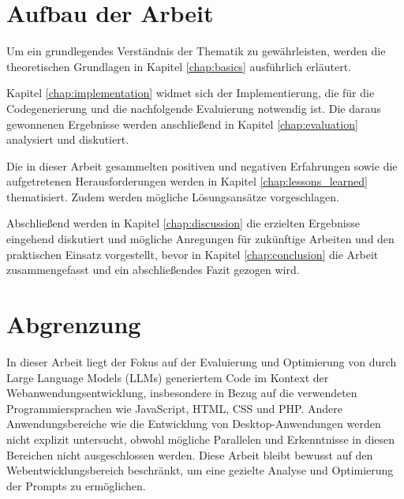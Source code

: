 

\section{Aufbau der Arbeit}
Um ein grundlegendes Verständnis der Thematik zu gewährleisten, werden die theoretischen Grundlagen in Kapitel \ref{chap:basics} ausführlich erläutert.\vspace{0.2cm}

Kapitel \ref{chap:implementation} widmet sich der Implementierung, die für die Codegenerierung und die nachfolgende Evaluierung notwendig ist. Die daraus gewonnenen Ergebnisse werden anschließend in Kapitel \ref{chap:evaluation} analysiert und diskutiert.\vspace{0.2cm}

Die in dieser Arbeit gesammelten positiven und negativen Erfahrungen sowie die aufgetretenen Herausforderungen werden in Kapitel \ref{chap:lessons_learned} thematisiert. Zudem werden mögliche Lösungsansätze vorgeschlagen.\vspace{0.2cm}

Abschließend werden in Kapitel \ref{chap:discussion} die erzielten Ergebnisse eingehend diskutiert und mögliche Anregungen für zukünftige Arbeiten und den praktischen Einsatz vorgestellt, bevor in Kapitel \ref{chap:conclusion} die Arbeit zusammengefasst und ein abschließendes Fazit gezogen wird.



\section{Abgrenzung}
In dieser Arbeit liegt der Fokus auf der Evaluierung und Optimierung von durch Large Language Models (LLMs) generiertem Code im Kontext der Webanwendungsentwicklung, insbesondere in Bezug auf die verwendeten Programmiersprachen wie JavaScript, HTML, CSS und PHP. Andere Anwendungsbereiche wie die Entwicklung von Desktop-Anwendungen werden nicht explizit untersucht, obwohl mögliche Parallelen und Erkenntnisse in diesen Bereichen nicht ausgeschlossen werden. Diese Arbeit bleibt bewusst auf den Webentwicklungsbereich beschränkt, um eine gezielte Analyse und Optimierung der Prompts zu ermöglichen.\vspace{0.2cm}

